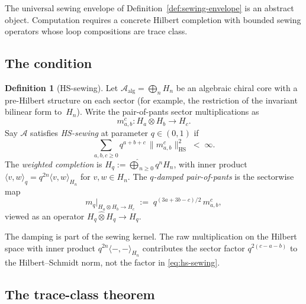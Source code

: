 \documentclass[11pt,reqno]{amsart}
\theoremstyle{definition}
\newtheorem{definition}[theorem]{Definition}
\theoremstyle{remark}
\newcommand{\cA}{\mathcal{A}}
\newcommand{\HS}{\mathrm{HS}}
\numberwithin{equation}{section}
\begin{document}
The universal sewing envelope of Definition~\ref{def:sewing-envelope}
is an abstract object. Computation requires a concrete Hilbert
completion with bounded sewing operators whose loop compositions are
trace class.

\subsection{The condition}\label{subsec:hs-definition}

\begin{definition}[HS-sewing]\label{def:hs-sewing}
Let $\cA_{\mathrm{alg}} = \bigoplus_n H_n$ be an algebraic
chiral core with a pre-Hilbert structure on each sector
(for example, the restriction of the invariant bilinear form
to~$H_n$).  Write the pair-of-pants sector multiplications as
\[
m_{a,b}^c \colon H_a \otimes H_b \longrightarrow H_c.
\]
Say $\cA$ satisfies \emph{HS-sewing} at parameter
$q \in (0,1)$ if
\begin{equation}\label{eq:hs-sewing}
\sum_{a,b,c \geq 0} q^{a+b+c}\,
\|m_{a,b}^c\|_{\HS}^2
\;<\; \infty.
\end{equation}
	The \emph{weighted completion} is
	$H_q := \widehat{\bigoplus}_{n \geq 0} q^n H_n$, with inner
	product
	$\langle v, w \rangle_q = q^{2n}\langle v, w\rangle_{H_n}$
	for $v, w \in H_n$.
	The \emph{$q$-damped pair-of-pants} is the sectorwise map
	\[
	m_q\big|_{H_a\otimes H_b\to H_c}
	\;:=\;
	q^{(3a+3b-c)/2}\,m_{a,b}^c ,
	\]
	viewed as an operator $H_q\widehat\otimes H_q\to H_q$.
	\end{definition}

	The damping is part of the sewing kernel.  The raw multiplication
	on the Hilbert space with inner product
	$q^{2n}\langle-,-\rangle_{H_n}$ contributes the sector factor
	$q^{2(c-a-b)}$ to the Hilbert--Schmidt norm, not the factor in
	\eqref{eq:hs-sewing}.

\subsection{The trace-class theorem}
\label{subsec:trace-class}
\end{document}
